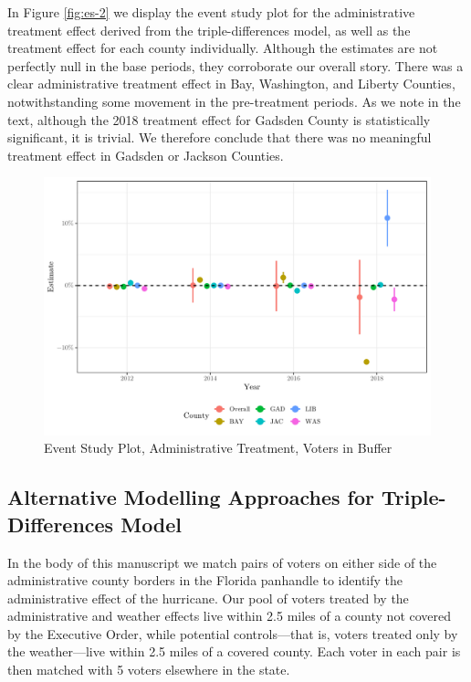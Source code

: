 \documentclass[
  12pt,
]{article}
\begin{document}
In Figure \ref{fig:es-2} we display the event study plot for the administrative treatment effect derived from the triple-differences model, as well as the treatment effect for each county individually. Although the estimates are not perfectly null in the base periods, they corroborate our overall story. There was a clear administrative treatment effect in Bay, Washington, and Liberty Counties, notwithstanding some movement in the pre-treatment periods. As we note in the text, although the 2018 treatment effect for Gadsden County is statistically significant, it is trivial. We therefore conclude that there was no meaningful treatment effect in Gadsden or Jackson Counties.

\begin{figure}[H]

{\centering \includegraphics{si_files/figure-latex/es2-1} 

}

\caption{\label{fig:es-2}Event Study Plot, Administrative Treatment, Voters in Buffer}\label{fig:es2}
\end{figure}

\hypertarget{alternative-modelling-approaches-for-triple-differences-model}{%
\subsection*{Alternative Modelling Approaches for Triple-Differences Model}\label{alternative-modelling-approaches-for-triple-differences-model}}

In the body of this manuscript we match pairs of voters on either side of the administrative county borders in the Florida panhandle to identify the administrative effect of the hurricane. Our pool of voters treated by the administrative and weather effects live within 2.5 miles of a county not covered by the Executive Order, while potential controls---that is, voters treated only by the weather---live within 2.5 miles of a covered county. Each voter in each pair is then matched with 5 voters elsewhere in the state.
\end{document}

